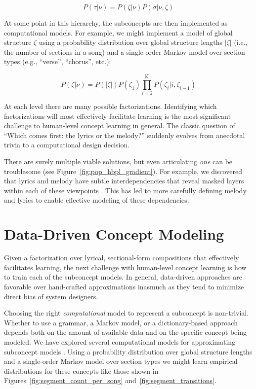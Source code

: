 \documentclass[letterpaper]{article}
\begin{document}
\[ P(\tau|\nu) = P(\zeta|\nu)P(\sigma|\nu,\zeta) \]

At some point in this hierarchy, the subconcepts are then implemented as computational models. For example, we might implement a model of global structure $\zeta$ using a probability distribution over global structure lengths $|\zeta|$ (i.e., the number of sections in a song) and a single-order Markov model over section types (e.g., ``verse'', ``chorus'', etc.):

\[ P(\zeta|\nu) = P(|\zeta|) P(\zeta_1) \prod_{i=2}^{|\zeta|} P(\zeta_i|i,\zeta_{i-1}) \]

At each level there are many possible factorizations. Identifying which factorizations will most effectively facilitate learning is the most significant challenge to human-level concept learning in general. The classic question of ``Which comes first: the lyrics or the melody?'' suddenly evolves from anecdotal trivia to a computational design decision.

There are surely multiple viable solutions, but even articulating \emph{one} can be troublesome (see Figure~\ref{fig:pop_hbpl_gradient}). For example, we discovered that lyrics and melody have subtle interdependencies that reveal masked layers within each of these viewpoints \cite{bodily2017Mume}. This has led to more carefully defining melody and lyrics to enable effective modeling of these dependencies.


\section{Data-Driven Concept Modeling}

Given a factorization over lyrical, sectional-form compositions that effectively facilitates learning, the next challenge with human-level concept learning is how to train each of the subconcept models. In general, data-driven approaches are favorable over hand-crafted approximations inasmuch as they tend to minimize direct bias of system designers.

Choosing the right \emph{computational} model to represent a subconcept is non-trivial. Whether to use a grammar, a Markov model, or a dictionary-based approach depends both on the amount of available data and on the specific concept being modeled. We have explored several computational models for approximating subconcept models \cite{bodily2017ICCC}. Using a probability distribution over global structure lengths and a single-order Markov model over section types we might learn empirical distributions for these concepts like those shown in Figures~\ref{fig:segment_count_per_song} and~\ref{fig:segment_transitions}.
\end{document}
